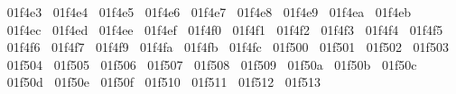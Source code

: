 {  ^^^^^^01f4e3%
  ^^^^^^01f4e4%
  ^^^^^^01f4e5%
  ^^^^^^01f4e6%
  ^^^^^^01f4e7%
  ^^^^^^01f4e8%
  ^^^^^^01f4e9%
  ^^^^^^01f4ea%
  ^^^^^^01f4eb%
  ^^^^^^01f4ec%
  ^^^^^^01f4ed%
  ^^^^^^01f4ee%
  ^^^^^^01f4ef%
  ^^^^^^01f4f0%
  ^^^^^^01f4f1%
  ^^^^^^01f4f2%
  ^^^^^^01f4f3%
  ^^^^^^01f4f4%
  ^^^^^^01f4f5%
  ^^^^^^01f4f6%
  ^^^^^^01f4f7%
  ^^^^^^01f4f9%
  ^^^^^^01f4fa%
  ^^^^^^01f4fb%
  ^^^^^^01f4fc%
  ^^^^^^01f500%
  ^^^^^^01f501%
  ^^^^^^01f502%
  ^^^^^^01f503%
  ^^^^^^01f504%
  ^^^^^^01f505%
  ^^^^^^01f506%
  ^^^^^^01f507%
  ^^^^^^01f508%
  ^^^^^^01f509%
  ^^^^^^01f50a%
  ^^^^^^01f50b%
  ^^^^^^01f50c%
  ^^^^^^01f50d%
  ^^^^^^01f50e%
  ^^^^^^01f50f%
  ^^^^^^01f510%
  ^^^^^^01f511%
  ^^^^^^01f512%
  ^^^^^^01f513%
}
